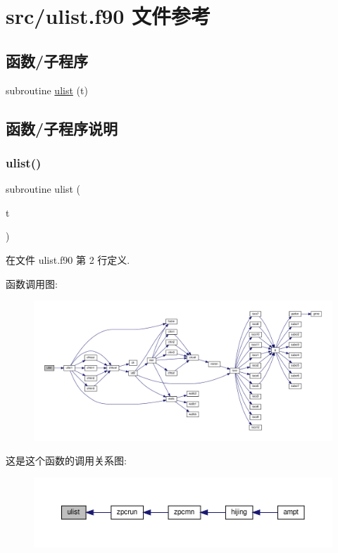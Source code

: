 \hypertarget{ulist_8f90}{}\section{src/ulist.f90 文件参考}
\label{ulist_8f90}
\subsection*{函数/子程序}
\begin{DoxyCompactItemize}
\item 
subroutine \mbox{\hyperlink{ulist_8f90_a07e1c6dbcff63cb0b425970293edd421}{ulist}} (t)
\end{DoxyCompactItemize}


\subsection{函数/子程序说明}
\mbox{\label{ulist_8f90_a07e1c6dbcff63cb0b425970293edd421}} 
\subsubsection{\texorpdfstring{ulist()}{ulist()}}
{\footnotesize\ttfamily subroutine ulist (\begin{DoxyParamCaption}\item[{}]{t }\end{DoxyParamCaption})}



在文件 ulist.\+f90 第 2 行定义.

函数调用图\+:
\nopagebreak
\begin{figure}[H]
\begin{center}
\leavevmode
\includegraphics[width=350pt]{ulist_8f90_a07e1c6dbcff63cb0b425970293edd421_cgraph}
\end{center}
\end{figure}
这是这个函数的调用关系图\+:
\nopagebreak
\begin{figure}[H]
\begin{center}
\leavevmode
\includegraphics[width=350pt]{ulist_8f90_a07e1c6dbcff63cb0b425970293edd421_icgraph}
\end{center}
\end{figure}
